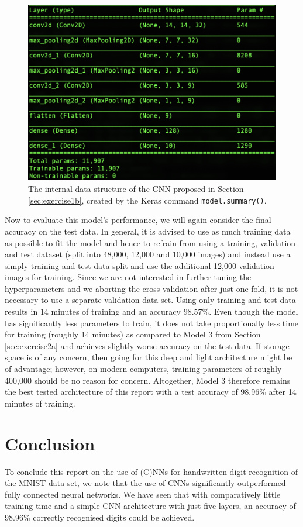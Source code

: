 \documentclass[12pt]{article}
\begin{document}
\begin{figure}[ht]
\centering
   \includegraphics[scale=0.7]{graphics/model2b.png}
    \caption{The internal data structure of the CNN proposed in Section \ref{sec:exercise1b}, created by the Keras command \texttt{model.summary()}.}
    \label{fig:exercise2b}
\end{figure}

Now to evaluate this model's performance, we will again consider the final accuracy on the test data. In general, it is advised to use as much training data as possible to fit the model and hence to refrain from using a training, validation and test dataset (split into 48,000, 12,000 and 10,000 images) and instead use a simply training and test data split and use the additional 12,000 validation images for training. Since we are not interested in further tuning the hyperparameters and we aborting the cross-validation after just one fold, it is not necessary to use a separate validation data set. Using only training and test data results in 14 minutes of training and an accuracy 98.57\%. Even though the model has significantly less parameters to train, it does not take proportionally less time for training (roughly 14 minutes) as compared to Model 3 from Section \ref{sec:exercise2a} and achieves slightly worse accuracy on the test data. If storage space is of any concern, then going for this deep and light architecture might be of advantage; however, on modern computers, training parameters of roughly 400,000 should be no reason for concern. Altogether, Model 3 therefore remains the best tested architecture of this report with a test accuracy of 98.96\% after 14 minutes of training. 


\newpage
\section{Conclusion}

To conclude this report on the use of (C)NNs for handwritten digit recognition of the MNIST data set, we note that the use of CNNs significantly outperformed fully connected neural networks. We have seen that with comparatively little training time and a simple CNN architecture with just five layers, an accuracy of 98.96\% correctly recognised digits could be achieved. 



\end{document}
